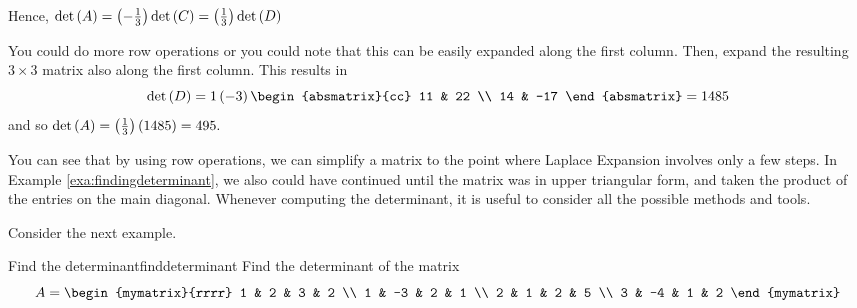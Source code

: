 \begin{solution}
Hence, $\det \left(A\right) = \left(-\frac{1}{3}\right) \det \left(C\right) = \left(\frac{1}{3}\right) \det \left(D\right)$ 

You could do more row operations or you could note that this can be easily
expanded along the first column. Then, expand the resulting $3 \times 3$ matrix
also along the first column. This results in 
\begin{equation*}
\det \tup{D} =1\tup{-3} \begin{absmatrix}{cc}
11 & 22 \\
14 & -17
\end{absmatrix}= 1485
\end{equation*}
and so  $\det \left(A\right) =\left(\frac{1}{3}\right) \left(1485\right)
=495.$
\end{solution} 

You can see that by using row operations, we can simplify a matrix
to the point where Laplace Expansion involves only a few steps. In Example
\ref{exa:findingdeterminant}, we also could have continued until the matrix was in 
upper triangular form, and taken the product of the entries on the main diagonal. Whenever 
computing the determinant, it is useful to consider all the possible methods and tools.

Consider the next example.

\begin{example}{Find the determinant}{finddeterminant}
Find the determinant of the matrix
\begin{equation*}
A = \begin{mymatrix}{rrrr}
1 & 2 & 3 & 2 \\
1 & -3 & 2 & 1 \\
2 & 1 & 2 & 5 \\
3 & -4 & 1 & 2
\end{mymatrix}
\end{equation*}
\end{example}

